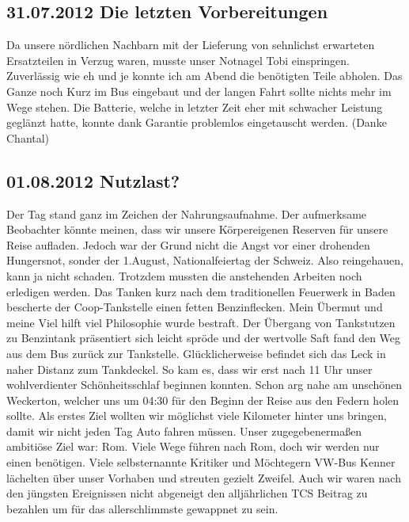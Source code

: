 \subsection{31.07.2012 Die letzten Vorbereitungen}
Da unsere nördlichen Nachbarn mit der Lieferung von sehnlichst erwarteten Ersatzteilen in Verzug waren, musste unser Notnagel Tobi einspringen.
Zuverlässig wie eh und je konnte ich am Abend die benötigten Teile abholen.
Das Ganze noch Kurz im Bus eingebaut und der langen Fahrt sollte nichts mehr im Wege stehen.
Die Batterie, welche in letzter Zeit eher mit schwacher Leistung geglänzt hatte, konnte dank Garantie problemlos eingetauscht werden. (Danke Chantal)

\subsection{01.08.2012 Nutzlast?}
Der Tag stand ganz im Zeichen der Nahrungsaufnahme.
Der aufmerksame Beobachter könnte meinen, dass wir unsere Körpereigenen Reserven für unsere Reise aufladen.
Jedoch war der Grund nicht die Angst vor einer drohenden Hungersnot, sonder der 1.August, Nationalfeiertag der Schweiz.
Also reingehauen, kann ja nicht schaden.
Trotzdem mussten die anstehenden Arbeiten noch erledigen werden.
Das Tanken kurz nach dem traditionellen Feuerwerk in Baden bescherte der Coop-Tankstelle einen fetten Benzinflecken.
Mein Übermut und meine Viel hilft viel Philosophie wurde bestraft.
Der Übergang von Tankstutzen zu Benzintank präsentiert sich leicht spröde und der wertvolle Saft fand den Weg aus dem Bus zurück zur Tankstelle.
Glücklicherweise befindet sich das Leck in naher Distanz zum Tankdeckel.
So kam es, dass wir erst nach 11 Uhr unser wohlverdienter Schönheitsschlaf beginnen konnten.
Schon arg nahe am unschönen Weckerton, welcher uns um 04:30 für den Beginn der Reise aus den Federn holen sollte. 
Als erstes Ziel wollten wir möglichst viele Kilometer hinter uns bringen, damit wir nicht jeden Tag Auto fahren müssen.
Unser zugegebenermaßen ambitiöse Ziel war: Rom.
Viele Wege führen nach Rom, doch wir werden nur einen benötigen.
Viele selbsternannte Kritiker und Möchtegern VW-Bus Kenner lächelten über unser Vorhaben und streuten gezielt Zweifel.
Auch wir waren nach den jüngsten Ereignissen nicht abgeneigt den alljährlichen TCS Beitrag zu bezahlen um für das allerschlimmste gewappnet zu sein.  

